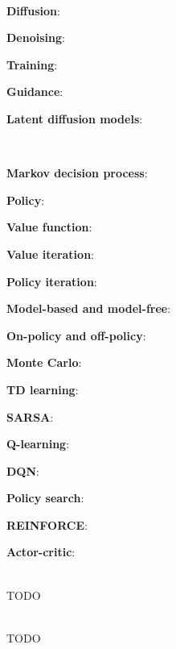 \documentclass{article}
\newenvironment{topic}[1]
{\textbf{\sffamily \colorbox{black}{\rlap{\textbf{\textcolor{white}{#1}}}\hspace{\linewidth}\hspace{-2\fboxsep}}} \\ \vspace{0.2cm}}
{}
\begin{document}
\begin{multicols*}{2}
\begin{topic}{Diffusion models}
        \textbf{Diffusion}:

        \textbf{Denoising}:

        \textbf{Training}:

        \textbf{Guidance}:

        \textbf{Latent diffusion models}:

    \end{topic}

    \begin{topic}{Reinforcement learning}

        \textbf{Markov decision process}:

        \textbf{Policy}:

        \textbf{Value function}:

        \textbf{Value iteration}:

        \textbf{Policy iteration}:

        \textbf{Model-based and model-free}:

        \textbf{On-policy and off-policy}:

        \textbf{Monte Carlo}:

        \textbf{TD learning}:

        \textbf{SARSA}:

        \textbf{Q-learning}:

        \textbf{DQN}:

        \textbf{Policy search}:

        \textbf{REINFORCE}:

        \textbf{Actor-critic}:

    \end{topic}

    \begin{topic}{Implicit surfaces and neural radiance fields}
        TODO
    \end{topic}

    \begin{topic}{Parametric human body models}
        TODO
    \end{topic}

\end{multicols*}
\end{document}
